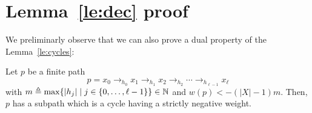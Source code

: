 \section{Lemma~\ref{le:dec} proof}\label{ap:proof}
We preliminarly observe that we can also prove a dual property of the
Lemma~\ref{le:cycles}:

\begin{lemma}\label{le:cyclesn}
  Let \(p\) be a finite path
  \[p = x_0 \to_{h_0} x_1 \to_{h_1} x_2 \to_{h_2} \cdots \to_{h_{\ell-1}} x_{\ell}\]
  with
  \(m \triangleq \max \{ |h_j| \mid j \in \{0, \ldots, \ell-1\}\}\in \mathbb{N}\) and 
  \(w(p) < -(|X|-1)m\). Then, \(p\) has a subpath which is a cycle having a 
  strictly negative weight.
\end{lemma}


